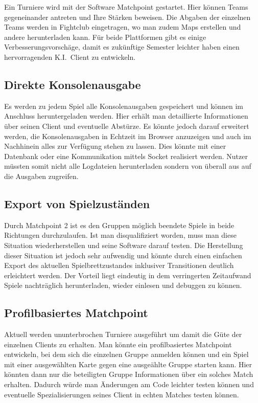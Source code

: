 Ein Turniere wird mit der Software Matchpoint gestartet.
Hier k\"onnen Teams gegeneinander antreten und Ihre St\"arken beweisen.
Die Abgaben der einzelnen Teams werden in Fightclub eingetragen, wo man zudem Maps erstellen und andere herunterladen kann.
F\"ur beide Plattformen gibt es einige Verbesserungsvorsch\"age, damit es zuk\"unftige Semester leichter haben einen hervorragenden K.I.\ Client zu entwickeln.

\subsection{Direkte Konsolenausgabe}\label{subsec:direkte-konsolenausgabe}
Es werden zu jedem Spiel alle Konsolenausgaben gespeichert und k\"onnen im Anschluss heruntergeladen werden.
Hier erh\"alt man detaillierte Informationen \"uber seinen Client und eventuelle Abst\"urze.
Es k\"onnte jedoch darauf erweitert werden, die Konsolenausgaben in Echtzeit im Browser anzuzeigen und auch im Nachhinein alles zur Verf\"ugung stehen zu lassen.
Dies k\"onnte mit einer Datenbank oder eine Kommunikation mittels Socket realisiert werden.
Nutzer m\"ussten somit nicht alle Logdateien herunterladen sondern von \"uberall aus auf die Ausgaben zugreifen.

\subsection{Export von Spielzust\"anden}\label{subsec:export-von-spielzustaenden}
Durch Matchpoint 2 ist es den Gruppen m\"oglich beendete Spiele in beide Richtungen durchzulaufen.
Ist man disqualifiziert worden, muss man diese Situation wiederherstellen und seine Software darauf testen.
Die Herstellung dieser Situation ist jedoch sehr aufwendig und k\"onnte durch einen einfachen Export des aktuellen Spielbrettzustandes inklusiver Transitionen deutlich erleichtert werden.
Der Vorteil liegt eindeutig in dem verringerten Zeitaufwand Spiele nachtr\"aglich herunterladen, wieder einlesen und debuggen zu k\"onnen.

\subsection{Profilbasiertes Matchpoint}\label{subsec:profilbasiertes-matchpoint}
Aktuell werden ununterbrochen Turniere ausgef\"uhrt um damit die G\"ute der einzelnen Clients zu erhalten.
Man k\"onnte ein profilbasiertes Matchpoint entwickeln, bei dem sich die einzelnen Gruppe anmelden k\"onnen und ein Spiel mit einer ausgew\"ahlten Karte gegen eine ausge\"ahlte Gruppe starten kann.
Hier k\"onnten dann nur die beteiligten Gruppe Informationen \"uber ein solches Match erhalten.
Dadurch w\"urde man \"Anderungen am Code leichter testen k\"onnen und eventuelle Spezialisierungen seines Client in echten Matches testen k\"onnen.

